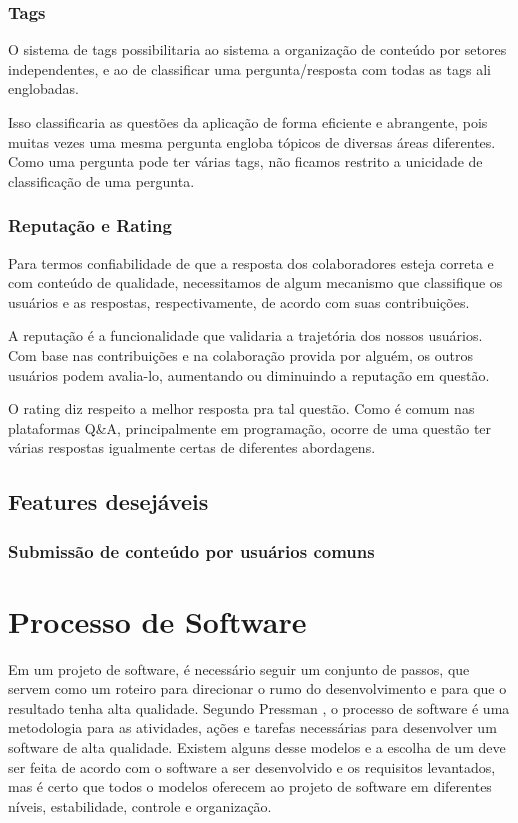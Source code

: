 \subsubsection{Tags}
O sistema de tags possibilitaria ao sistema a organização de conteúdo por setores independentes, e ao de classificar uma pergunta/resposta com todas as tags ali englobadas.

Isso classificaria as questões da aplicação de forma eficiente e abrangente, pois muitas vezes uma mesma pergunta engloba tópicos de diversas áreas diferentes. Como uma pergunta pode ter várias tags, não ficamos restrito a unicidade de classificação de uma pergunta.
\subsubsection{Reputação e Rating}
Para termos confiabilidade de que a resposta dos colaboradores esteja correta e com conteúdo de qualidade, necessitamos de algum mecanismo que classifique os usuários e as respostas, respectivamente, de acordo com suas contribuições.

A reputação é a funcionalidade que validaria a trajetória dos nossos usuários. Com base nas contribuições e na colaboração provida por alguém, os outros usuários podem avalia-lo, aumentando ou diminuindo a reputação em questão. 

O rating diz respeito a melhor resposta pra tal questão. Como é comum nas plataformas Q\&A, principalmente em programação, ocorre de uma questão ter várias respostas igualmente certas de diferentes abordagens.

\subsection{Features desejáveis}

\subsubsection{Submissão de conteúdo por usuários comuns}

\section{Processo de Software}

Em um projeto de software, é necessário seguir um conjunto de passos, que servem como um roteiro para direcionar o rumo do desenvolvimento e para que o resultado tenha alta qualidade. Segundo Pressman \cite{pressman2016engenharia}, o processo de software é uma metodologia para as atividades, ações e tarefas necessárias para desenvolver um software de alta qualidade. Existem alguns desse modelos e a escolha de um deve ser feita de acordo com o software a ser desenvolvido e os requisitos levantados, mas é certo que todos o modelos oferecem ao projeto de software em diferentes níveis, estabilidade, controle e organização.

